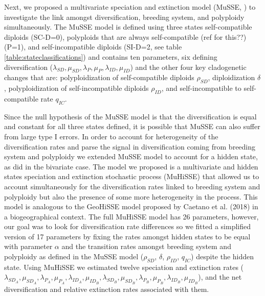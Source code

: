 Next, we proposed a multivariate speciation and extinction model (MuSSE, \citet{fitzjohn_2012}) to investigate the link amongst diversification, breeding system, and polyploidy simultaneously.
The MuSSE model is defined using three states self-compatible diploids (SC-D=0), polyploids that are always self-compatible (ref for this??) (P=1), and self-incompatible diploids (SI-D=2, see table \cref{table:stateclassifications}) and contains ten parameters, six defining diversification ($\lambda_{SD}, \mu_{SD},\lambda_{P},\mu_{P}, \lambda_{ID},\mu_{ID}$) and the other four key cladogenetic changes that are: polyploidization of self-compatible diploids $\rho_{SD}$, diploidization $\delta$, polyploidization of self-incompatible diploids $\rho_{ID}$, and self-incompatible to self-compatible rate $q_{IC}$.

Since the null hypothesis of the MuSSE model is that the diversification is equal and constant for all three states defined, it is possible that MuSSE can also suffer from large type I errors.
In order to account for heterogeneity of the diversification rates and parse the signal in diversification coming from breeding system and polyploidy we extended MuSSE model to account for a hidden state, as \citet{beaulieu_2016} did in the bivariate case.
The model we proposed is a multivariate and hidden states speciation and extinction stochastic process (MuHiSSE) that allowed us to account simultaneously for the diversification rates linked to breeding system and polyploidy but also the presence of some more heterogeneity in the process.
This model is analogous to the GeoHiSSE model proposed by Caetano et al. (2018) in a biogeographical context.
The full MuHiSSE model has 26 parameters, however, our goal was to look for diversification rate differences so we fitted a simplified version of 17 parameters by fixing the rates amongst hidden states to be equal with parameter $\alpha$ and the transition rates amongst breeding system and polyploidy as defined in the MuSSE model  ($\rho_{SD}$,  $\delta$,  $\rho_{ID}$,  $q_{IC}$) despite the hidden state.
Using MuHiSSE we estimated twelve speciation and extinction rates ($\lambda_{SD_A}, \mu_{SD_A},\lambda_{P_A},\mu_{P_A}, \lambda_{ID_A},\mu_{ID_B},\lambda_{SD_B}, \mu_{SD_B},\lambda_{P_B},\mu_{P_B}, \lambda_{ID_B},\mu_{ID_B}$), and the net diversification and relative extinction rates associated with them.

